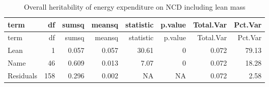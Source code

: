 \documentclass[]{article}
\newenvironment{Shaded}{\begin{snugshade}}{\end{snugshade}}
\newcommand{\DataTypeTok}[1]{\textcolor[rgb]{0.13,0.29,0.53}{#1}}
\newcommand{\DecValTok}[1]{\textcolor[rgb]{0.00,0.00,0.81}{#1}}
\newcommand{\KeywordTok}[1]{\textcolor[rgb]{0.13,0.29,0.53}{\textbf{#1}}}
\newcommand{\NormalTok}[1]{#1}
\newcommand{\OperatorTok}[1]{\textcolor[rgb]{0.81,0.36,0.00}{\textbf{#1}}}
\newcommand{\StringTok}[1]{\textcolor[rgb]{0.31,0.60,0.02}{#1}}
\begin{document}
\begin{longtable}[]{@{}lrrrrrrr@{}}
\caption{Overall heritability of energy expenditure on NCD including
lean mass}\tabularnewline
\toprule
term & df & sumsq & meansq & statistic & p.value & Total.Var &
Pct.Var\tabularnewline
\midrule
\endfirsthead
\toprule
term & df & sumsq & meansq & statistic & p.value & Total.Var &
Pct.Var\tabularnewline
\midrule
\endhead
Lean & 1 & 0.057 & 0.057 & 30.61 & 0 & 0.072 & 79.13\tabularnewline
Name & 46 & 0.609 & 0.013 & 7.07 & 0 & 0.072 & 18.28\tabularnewline
Residuals & 158 & 0.296 & 0.002 & NA & NA & 0.072 & 2.58\tabularnewline
\bottomrule
\end{longtable}

\begin{Shaded}
\end{Shaded}
\end{document}
